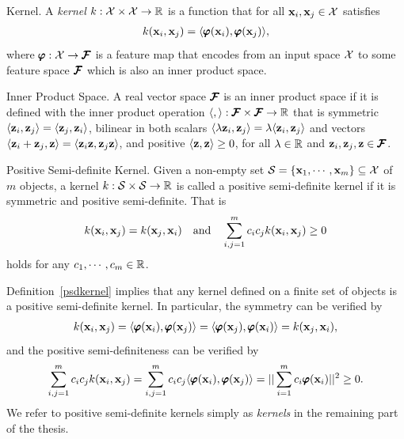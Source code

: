 {%
\begin{definition}{Kernel.}
	A \textit{kernel} $k:\mathcal{X}\times\mathcal{X}\rightarrow\mathbb{R}$ is a function that for all $\mathbf {x}_i,\mathbf {x}_j\in\mathcal{X}$ satisfies
	\begin{align*}
		k(\mathbf {x}_i,\mathbf {x}_j) = \langle \pmb \varphi(\mathbf {x}_i), \pmb \varphi(\mathbf {x}_j) \rangle,
	\end{align*}
	where $\pmb \varphi:\mathcal{X}\rightarrow\pmb {\mathcal{F}}$ is a feature map that encodes from an input space $\mathcal{X}$ to some feature space $\pmb {\mathcal{F}}$ which is also an inner product space.
\end{definition}
\begin{definition}{Inner Product Space.}
	A real vector space $\pmb {\mathcal{F}}$ is an inner product space if it is defined with the inner product operation $\langle ,  \rangle:\pmb {\mathcal{F}}\times\pmb {\mathcal{F}}\rightarrow\mathbb{R}$ that is symmetric $\langle \mathbf {z}_i, \mathbf {z}_j \rangle = \langle \mathbf {z}_j, \mathbf {z}_i \rangle$, bilinear in both scalars $\langle \lambda\mathbf {z}_i, \mathbf {z}_j \rangle = \lambda\langle \mathbf {z}_i, \mathbf {z}_j \rangle$ and vectors $\langle \mathbf {z}_i+\mathbf {z}_j, \mathbf {z} \rangle = \langle \mathbf {z}_i\mathbf {z}, \mathbf {z}_j\mathbf {z} \rangle$, and positive $\langle \mathbf {z}, \mathbf {z} \rangle\ge0$, for all $\lambda\in\mathbb{R}$ and $\mathbf {z}_i,\mathbf {z}_j,\mathbf {z}\in\pmb {\mathcal{F}}$.
\end{definition}
\begin{definition}{Positive Semi-definite Kernel.}\label{psdkernel}
	Given a non-empty set $\mathcal{S}=\{\mathbf {x}_1,\cdots,\mathbf {x}_m\}\subseteq\mathcal{X}$ of $m$ objects, a kernel $k:\mathcal{S}\times\mathcal{S}\rightarrow\mathbb{R}$ is called a positive semi-definite kernel if it is symmetric and positive semi-definite. That is
	\begin{align*}
		k(\mathbf {x}_i,\mathbf {x}_j) = k(\mathbf {x}_j,\mathbf {x}_i)\quad \text{and}\quad \sum_{i,j=1}^mc_ic_jk(\mathbf {x}_i,\mathbf {x}_j)\ge0
	\end{align*}
	holds for any $c_1,\cdots,c_m\in\mathbb{R}$.
\end{definition}
\noindent
Definition~\ref{psdkernel} implies that any kernel defined on a finite set of objects is a positive semi-definite kernel.
In particular, the symmetry can be verified by
\begin{align*}
	k(\mathbf {x}_i,\mathbf {x}_j) = \langle \pmb \varphi(\mathbf {x}_i), \pmb \varphi(\mathbf {x}_j) \rangle = \langle \pmb \varphi(\mathbf {x}_j), \pmb \varphi(\mathbf {x}_i) \rangle = k(\mathbf {x}_j,\mathbf {x}_i),
\end{align*}
and the positive semi-definiteness can be verified by
\begin{align}
	\sum_{i,j=1}^{m}c_ic_jk(\mathbf {x}_i,\mathbf {x}_j) = \sum_{i,j=1}^{m}c_ic_j\langle \pmb \varphi(\mathbf {x}_i), \pmb \varphi(\mathbf {x}_j) \rangle = ||\sum_{i=1}^{m}c_i\pmb \varphi(\mathbf {x}_i)||^2\ge0. \label{psd}
\end{align}
We refer to positive semi-definite kernels simply as \textit{kernels} in the remaining part of the thesis.
}

